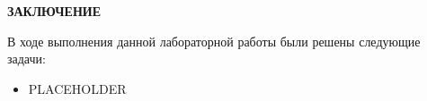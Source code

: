 \begin{center}
    \textbf{ЗАКЛЮЧЕНИЕ}
\end{center}


\vspace{5mm}

В ходе выполнения данной лабораторной работы были решены следующие задачи:
\begin{itemize}
	\item PLACEHOLDER
\end{itemize}